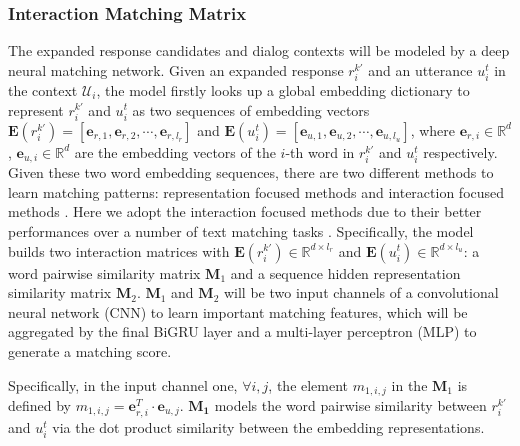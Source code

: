 \subsubsection{\textbf{Interaction Matching Matrix}}
The expanded response candidates and dialog contexts will be modeled by a deep neural matching network. Given an expanded response $r_i^{k'}$ and an utterance $u_i^t$ in the context $\mathcal{U}_{i}$, the model firstly looks up a global embedding dictionary to represent  $r_i^{k'}$ and $u_i^t$ as two sequences of embedding vectors $\mathbf{E}(r_i^{k'})=[\mathbf{e}_{r,1}, \mathbf{e}_{r,2}, \cdots, \mathbf{e}_{r,l_r}]$ and  $\mathbf{E}(u_i^t)=[\mathbf{e}_{u,1}, \mathbf{e}_{u,2}, \cdots, \mathbf{e}_{u,l_u}]$, where $\mathbf{e}_{r,i} \in \mathbb{R}^d$, $\mathbf{e}_{u,i} \in \mathbb{R}^d$  are the embedding vectors of the $i$-th word in $r_i^{k'}$ and $u_i^t$ respectively. Given these two word embedding sequences, there are two different methods to learn matching patterns: representation focused methods and interaction focused methods \cite{Guo:2016:DRM:2983323.2983769}. Here we adopt the interaction focused methods due to their better performances over a number of text matching tasks \cite{DBLP:conf/nips/HuLLC14,DBLP:conf/aaai/PangLGXWC16,DBLP:conf/aaai/WanLGXPC16,Yang:2016:ARS:2983323.2983818}. Specifically, the model builds two interaction matrices with $\mathbf{E}(r_i^{k'}) \in \mathbb{R}^{d\times l_r}$ and $\mathbf{E}(u_i^t) \in \mathbb{R}^{d\times l_u}$: a word pairwise similarity matrix $\mathbf{M}_1$ and a sequence hidden representation similarity matrix $\mathbf{M}_2$.  $\mathbf{M}_1$ and $\mathbf{M}_2$ will be two input channels of a convolutional neural network (CNN) to learn important matching features, which will be aggregated by the final BiGRU layer and a multi-layer perceptron (MLP) to generate a matching score.

Specifically, in the input channel one, $\forall i, j$, the element $m_{1,i,j}$ in the $\mathbf{M}_1$ is defined by $m_{1,i,j} = \mathbf{e}_{r,i}^T \cdot \mathbf{e}_{u,j}$.
$\mathbf{M_1}$ models the word pairwise similarity between $r_i^{k'}$ and $u_i^t$ via the dot product similarity between the embedding representations.

